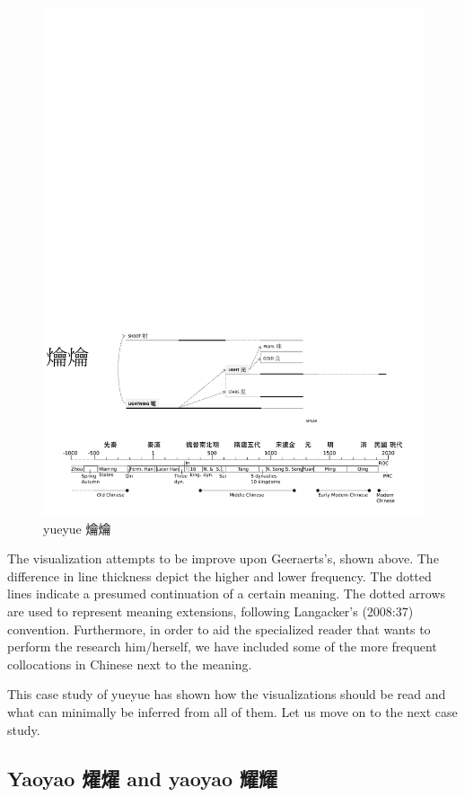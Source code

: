 \documentclass[12pt,article,oneside]{memoir}
\theoremstyle{definition}
\theoremstyle{definition}
\theoremstyle{definition}
\theoremstyle{remark}
\begin{document}
\begin{figure}
\centering
\includegraphics{ideos/yueyue.pdf}
\caption{\label{fig:yueyue}yueyue 爚爚}
\end{figure}

The visualization attempts to be improve upon Geeraerts's, shown above.
The difference in line thickness depict the higher and lower frequency.
The dotted lines indicate a presumed continuation of a certain meaning.
The dotted arrows are used to represent meaning extensions, following
Langacker's (2008:37) convention. Furthermore, in order to aid the
specialized reader that wants to perform the research him/herself, we
have included some of the more frequent collocations in Chinese next to
the meaning.

This case study of yueyue has shown how the visualizations should be
read and what can minimally be inferred from all of them. Let us move on
to the next case study.

\subsection{Yaoyao 燿燿 and yaoyao 耀耀}\label{yaoyao--and-yaoyao-}
\end{document}
